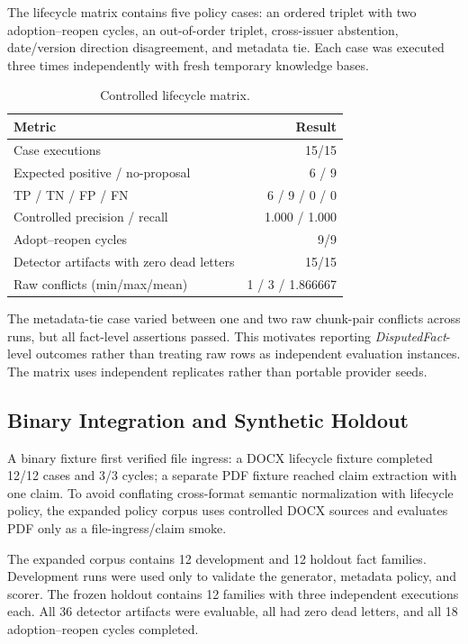 \documentclass[conference]{IEEEtran}
\newcommand{\disputedfact}{\textit{DisputedFact}}
\begin{document}
The lifecycle matrix contains five policy cases: an ordered triplet with two adoption--reopen cycles, an out-of-order triplet, cross-issuer abstention, date/version direction disagreement, and metadata tie. Each case was executed three times independently with fresh temporary knowledge bases.

\begin{table}[t]
\caption{Controlled lifecycle matrix.}
\label{tab:lifecycle}
\centering
\small
\begin{tabular}{lr}
\toprule
Metric & Result \\
\midrule
Case executions & 15/15 \\
Expected positive / no-proposal & 6 / 9 \\
TP / TN / FP / FN & 6 / 9 / 0 / 0 \\
Controlled precision / recall & 1.000 / 1.000 \\
Adopt--reopen cycles & 9/9 \\
Detector artifacts with zero dead letters & 15/15 \\
Raw conflicts (min/max/mean) & 1 / 3 / 1.866667 \\
\bottomrule
\end{tabular}
\end{table}

The metadata-tie case varied between one and two raw chunk-pair conflicts across runs, but all fact-level assertions passed. This motivates reporting \disputedfact{}-level outcomes rather than treating raw rows as independent evaluation instances. The matrix uses independent replicates rather than portable provider seeds.

\subsection{Binary Integration and Synthetic Holdout}

A binary fixture first verified file ingress: a DOCX lifecycle fixture completed 12/12 cases and 3/3 cycles; a separate PDF fixture reached claim extraction with one claim. To avoid conflating cross-format semantic normalization with lifecycle policy, the expanded policy corpus uses controlled DOCX sources and evaluates PDF only as a file-ingress/claim smoke.

The expanded corpus contains 12 development and 12 holdout fact families. Development runs were used only to validate the generator, metadata policy, and scorer. The frozen holdout contains 12 families with three independent executions each. All 36 detector artifacts were evaluable, all had zero dead letters, and all 18 adoption--reopen cycles completed.
\end{document}
